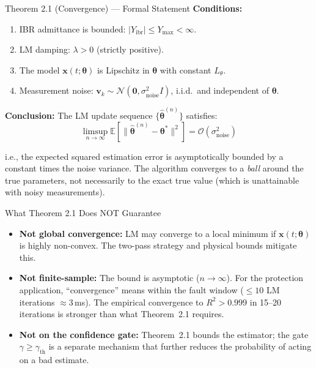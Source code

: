 \documentclass[12pt,a4paper]{article}
\newcommand{\thetahat}{\hat{\bm{\theta}}}
\newcommand{\thetastar}{\bm{\theta}^*}
\newcommand{\gammath}{\gamma_\mathrm{th}}
\begin{document}
\begin{resultbox}{Theorem 2.1 (Convergence) --- Formal Statement}
\textbf{Conditions:}
\begin{enumerate}[nosep,label=(\roman*)]
  \item IBR admittance is bounded: $|Y_\mathrm{ibr}| \leq Y_\mathrm{max} < \infty$.
  \item LM damping: $\lambda > 0$ (strictly positive).
  \item The model $\mathbf{x}(t;\bm{\theta})$ is Lipschitz in $\bm{\theta}$
        with constant $L_\theta$.
  \item Measurement noise: $\mathbf{v}_k \sim \mathcal{N}(\mathbf{0}, \sigma_\mathrm{noise}^2 I)$,
        i.i.d.\ and independent of $\bm{\theta}$.
\end{enumerate}

\textbf{Conclusion:} The LM update sequence $\{\thetahat^{(n)}\}$ satisfies:
\begin{equation}
  \limsup_{n\to\infty} \mathbb{E}\left[\|\thetahat^{(n)} - \thetastar\|^2\right]
  = \mathcal{O}(\sigma_\mathrm{noise}^2)
  \label{eq:thm21}
\end{equation}

i.e., the expected squared estimation error is asymptotically bounded by a
constant times the noise variance.  The algorithm converges to a \emph{ball}
around the true parameters, not necessarily to the exact true value (which
is unattainable with noisy measurements).
\end{resultbox}

\begin{keybox}{What Theorem 2.1 Does NOT Guarantee}
\begin{itemize}[nosep]
  \item \textbf{Not global convergence:} LM may converge to a local minimum if
        $\mathbf{x}(t;\bm{\theta})$ is highly non-convex.  The two-pass strategy
        and physical bounds mitigate this.
  \item \textbf{Not finite-sample:} The bound is asymptotic ($n \to \infty$).
        For the protection application, ``convergence'' means within the fault
        window ($\leq 10$ LM iterations $\approx 3$\,ms).  The empirical
        convergence to $R^2 > 0.999$ in 15--20 iterations is stronger than
        what Theorem~2.1 requires.
  \item \textbf{Not on the confidence gate:} Theorem~2.1 bounds the estimator;
        the gate $\gamma \geq \gammath$ is a separate mechanism that further
        reduces the probability of acting on a bad estimate.
\end{itemize}
\end{keybox}
\end{document}
